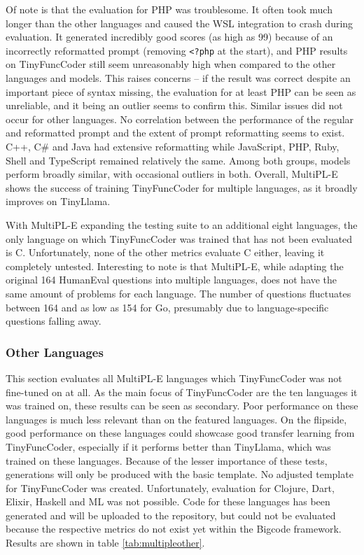 Of note is that the evaluation for PHP was troublesome. It often took much longer than the other languages and caused the WSL integration to crash during evaluation.
It generated incredibly good scores (as high as 99) because of an incorrectly reformatted prompt (removing \texttt{<?php} at the start), and PHP results on TinyFuncCoder still seem unreasonably high when compared to the other languages and models.
This raises concerns -- if the result was correct despite an important piece of syntax missing, the evaluation for at least PHP can be seen as unreliable, and it being an outlier seems to confirm this.
Similar issues did not occur for other languages.
No correlation between the performance of the regular and reformatted prompt and the extent of prompt reformatting seems to exist.
C++, C\# and Java had extensive reformatting while JavaScript, PHP, Ruby, Shell and TypeScript remained relatively the same.
Among both groups, models perform broadly similar, with occasional outliers in both.
Overall, MultiPL-E shows the success of training TinyFuncCoder for multiple languages, as it broadly improves on TinyLlama.

With MultiPL-E expanding the testing suite to an additional eight languages, the only language on which TinyFuncCoder was trained that has not been evaluated is C.
Unfortunately, none of the other metrics evaluate C either, leaving it completely untested.
Interesting to note is that MultiPL-E, while adapting the original 164 HumanEval questions into multiple languages, does not have the same amount of problems for each language.
The number of questions fluctuates between 164 and as low as 154 for Go, presumably due to language-specific questions falling away.


\subsubsection{Other Languages}
\label{sec:multipleother}
This section evaluates all MultiPL-E languages which TinyFuncCoder was not fine-tuned on at all.
As the main focus of TinyFuncCoder are the ten languages it was trained on, these results can be seen as secondary.
Poor performance on these languages is much less relevant than on the featured languages.
On the flipside, good performance on these languages could showcase good transfer learning from TinyFuncCoder, especially if it performs better than TinyLlama, which was trained on these languages.
Because of the lesser importance of these tests, generations will only be produced with the basic template.
No adjusted template for TinyFuncCoder was created.
Unfortunately, evaluation for Clojure, Dart, Elixir, Haskell and ML was not possible.
Code for these languages has been generated and will be uploaded to the repository, but could not be evaluated because the respective metrics do not exist yet within the Bigcode framework.
Results are shown in table \ref{tab:multipleother}.


